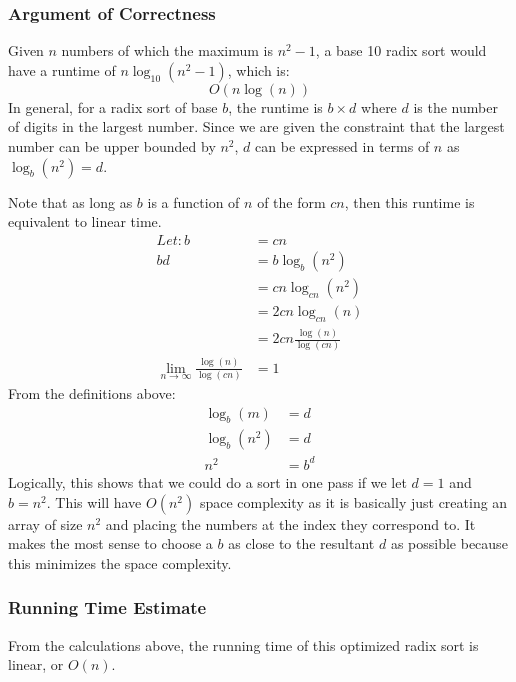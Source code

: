 \documentclass{math}
\begin{document}
\subsubsection*{Argument of Correctness}
Given \( n \) numbers of which the maximum is \( n^2-1 \), a base 10 radix sort
would have a runtime of \( n\log_{10}(n^2-1) \), which is:
\[ O(n\log(n)) \]
In general, for a radix sort of base \( b \), the runtime is \( b\times d \)
where \( d \) is the number of digits in the largest number. Since we are given
the constraint that the largest number can be upper bounded by \( n^2 \),
\( d \) can be expressed in terms of \( n \) as \( \log_b(n^2) = d \). \par
Note that as long as \( b \) is a function of \( n \) of the form \( cn \), then
this runtime is equivalent to linear time.
\begin{align*}
  Let: b &= cn \\
  bd &= b\log_b(n^2) \\
  &= cn\log_{cn}(n^2) \\
  &= 2cn\log_{cn}(n) \\
  &= 2cn\frac{\log(n)}{\log(cn)} \\
  \lim_{n\to\infty}\frac{\log(n)}{\log(cn)} &= 1
\end{align*}
From the definitions above:
\begin{align*}
  \log_b(m) &= d \\
  \log_b(n^2) &= d \\
  n^2 &= b^d
\end{align*}
Logically, this shows that we could do a sort in one pass if we let \( d = 1 \)
and \( b = n^2 \). This will have \( O(n^2) \) space complexity as it is
basically just creating an array of size \( n^2 \) and placing the numbers at
the index they correspond to. It makes the most sense to choose a \( b \) as
close to the resultant \( d \) as possible because this minimizes the space
complexity.

\subsubsection*{Running Time Estimate}
From the calculations above, the running time of this optimized radix sort is
linear, or \( O(n) \).
\end{document}

